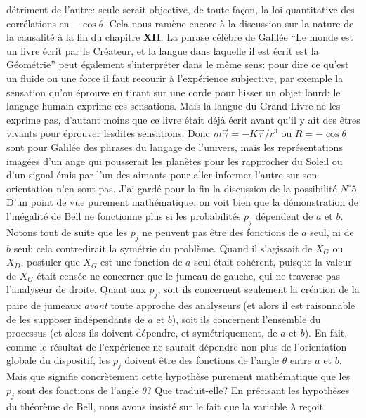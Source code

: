 d\'etriment de l'autre: seule serait objective, de toute fa\c{c}on, la loi 
quantitative des corr\'elations en $-\cos\theta$. Cela nous ram\`ene 
encore \`a la discussion sur la nature de la causalit\'e \`a la fin du 
chapitre {\bf XII}. La phrase c\'el\`ebre de Galil\'ee ``Le monde est un 
livre \'ecrit par le Cr\'eateur, et la langue dans laquelle il est \'ecrit 
est la G\'eom\'etrie'' peut \'egalement s'interpr\'eter dans le  m\^eme 
sens:  pour dire ce qu'est un fluide ou une force il faut recourir \`a 
l'exp\'erience subjective,  par exemple la sensation qu'on \'eprouve en 
tirant sur une corde pour hisser un objet lourd;  le langage humain 
exprime ces sensations.  Mais la langue  du Grand Livre ne les exprime 
pas,  d'autant moins que ce livre \'etait d\'ej\`a \'ecrit avant qu'il
y ait des \^etres vivants pour \'eprouver lesdites sensations. Donc
$m\vec\gamma = -K\vec r / r^3$ ou  $R = -\cos\theta$ sont pour 
Galil\'ee des phrases du langage de l'univers, mais les repr\'esentations 
imag\'ees d'un ange qui pousserait les plan\`etes pour  les rapprocher  
du Soleil ou d'un signal \'emis par l'un  des aimants pour aller informer 
l'autre sur son orientation n'en sont pas. 
\medskip
J'ai gard\'e pour la fin la discussion de la possibilit\'e
$N^\circ 5$.  D'un point de vue purement math\'ematique, 
on voit bien que la d\'emonstration de l'in\'egalit\'e de
Bell ne fonctionne plus si les probabilit\'es $p_j$ d\'ependent
de $a$ et $b$.  Notons tout de suite que les $p_j$ ne peuvent
pas \^etre des fonctions de $a$ seul,  ni de $b$ seul: 
cela contredirait la sym\'etrie du probl\`eme.  Quand il
s'agissait de $X_G$ ou $X_D$,  postuler que $X_G$ est une
fonction de $a$ seul \'etait coh\'erent,  puisque la valeur de
$X_G$ \'etait cens\'ee ne concerner que le jumeau de gauche, 
qui ne traverse pas l'analyseur de droite.  Quant aux $p_j$, 
soit ils concernent seulement la cr\'eation de la paire de
jumeaux {\it avant} toute approche des analyseurs (et alors il
est raisonnable de les supposer ind\'ependants de $a$ et $b$), 
soit ils concernent l'ensemble du processus (et alors ils doivent
d\'ependre,  et sym\'etriquement,  de $a$ et $b$).  En fait, 
comme le r\'esultat de l'exp\'erience ne saurait d\'ependre non
plus de l'orientation globale du dispositif,  les $p_j$ doivent
\^etre des fonctions de l'angle $\theta$ entre $a$ et $b$. 
\medskip
Mais que signifie concr\`etement cette hypoth\`ese purement
math\'ematique que les $p_j$ sont des fonctions de l'angle
$\theta$?  Que traduit-elle? 
\medskip
En pr\'ecisant les hypoth\`eses du th\'eor\`eme de Bell,  nous
avons insist\'e sur le fait que la variable $\lambda$ re\c{c}oit
